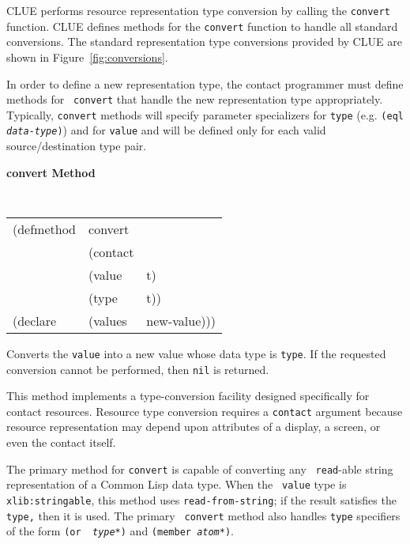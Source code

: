 \documentclass[twoside]{book}
\begin{document}
\begin{sloppy}
CLUE performs resource representation type conversion by calling the
{\tt convert} function. 
CLUE defines methods for the {\tt convert} function to handle all standard
conversions. 
The standard representation type conversions provided by CLUE are shown
in Figure~\ref{fig:conversions}.

In order
to define a new representation type, the contact programmer must define
methods for {\tt
convert} that handle the new representation type appropriately. Typically,
{\tt convert} methods will specify parameter specializers for {\tt type}
(e.g. {\tt (eql {\em data-type})}) and for {\tt value} and will be defined only
for each valid source/destination type pair. 


{\large {\bf convert \hfill Method}}
\begin{flushright}
\parbox[t]{6.125in}{
\tt
\begin{tabular}{lll}
\raggedright
(defmethod & convert & \\
& (contact\\
& (value & t)\\
& (type  & t))\\
(declare &(values &new-value)))
\end{tabular}
\rm

Converts the {\tt value} into a new value whose data type is {\tt type}. If the
requested conversion cannot be performed, then {\tt nil} is returned.
 
This
method implements a type-conversion facility designed specifically for contact
resources.
Resource type conversion requires a {\tt contact} argument because resource
representation may depend upon attributes of a display, a screen, or even the
contact itself. 

The primary method for {\tt convert} is capable of converting any {\tt
read}-able string representation of a Common Lisp data type. When the {\tt
value} type is {\tt xlib:stringable}, this method uses {\tt read-from-string};
if the result satisfies the {\tt type,} then it is used. The primary {\tt
convert} method also handles {\tt type} specifiers of the form {\tt (or {\em
type*})} and {\tt (member {\em atom*})}.

}\end{flushright}


\end{sloppy}
\end{document}
